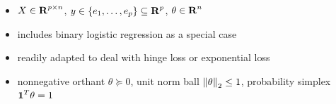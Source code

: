 \documentclass[a0]{a0poster}
\begin{document}
\begin{textblock}{7}
\begin{itemize}
        \item $X \in {\bf R{}}^{p \times n}$, $y \in \{e_1, \ldots, e_p\} \subseteq {\bf R{}}^p$, $\theta \in {\bf R{}}^n$
        \item includes binary logistic regression as a special case
        \item readily adapted to deal with hinge loss or exponential loss
    \end{itemize}
    \begin{itemize}
        \item nonnegative orthant $\theta \succeq 0$, unit norm ball ${\lVert \theta \rVert}_2 \leq 1$, probability simplex ${\bf 1{}}^T \theta = 1$
    \end{itemize}
\end{textblock}
\end{document}
